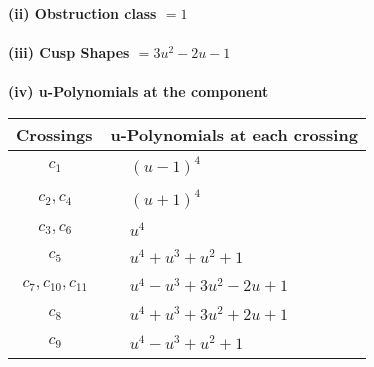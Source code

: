 \documentclass[1p]{elsarticle_modified}
\theoremstyle{definition}
\begin{document}
\flushleft \textbf{(ii) Obstruction class $= 1$}\\~\\
\flushleft \textbf{(iii) Cusp Shapes $= 3 u^2-2 u-1$}\\~\\
\newpage\renewcommand{\arraystretch}{1}
\flushleft \textbf{(iv) u-Polynomials at the component}\newline \\
\begin{tabular}{m{50pt}|m{274pt}}
Crossings & \hspace{64pt}u-Polynomials at each crossing \\
\hline $$\begin{aligned}c_{1}\end{aligned}$$&$\begin{aligned}
&(u-1)^4
\end{aligned}$\\
\hline $$\begin{aligned}c_{2},c_{4}\end{aligned}$$&$\begin{aligned}
&(u+1)^4
\end{aligned}$\\
\hline $$\begin{aligned}c_{3},c_{6}\end{aligned}$$&$\begin{aligned}
&u^4
\end{aligned}$\\
\hline $$\begin{aligned}c_{5}\end{aligned}$$&$\begin{aligned}
&u^4+u^3+u^2+1
\end{aligned}$\\
\hline $$\begin{aligned}c_{7},c_{10},c_{11}\end{aligned}$$&$\begin{aligned}
&u^4- u^3+3 u^2-2 u+1
\end{aligned}$\\
\hline $$\begin{aligned}c_{8}\end{aligned}$$&$\begin{aligned}
&u^4+u^3+3 u^2+2 u+1
\end{aligned}$\\
\hline $$\begin{aligned}c_{9}\end{aligned}$$&$\begin{aligned}
&u^4- u^3+u^2+1
\end{aligned}$\\
\hline
\end{tabular}\\~\\
\end{document}
